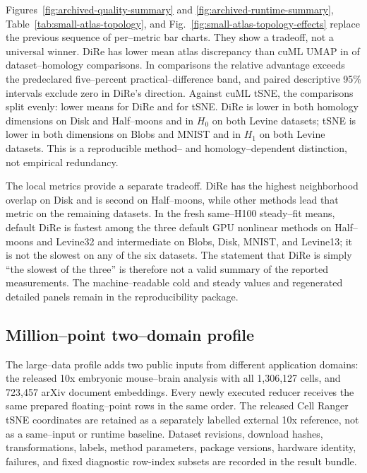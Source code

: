 \documentclass[11pt]{article}
\begin{document}
Figures~\ref{fig:archived-quality-summary} and
\ref{fig:archived-runtime-summary}, Table~\ref{tab:small-atlas-topology}, and
Fig.~\ref{fig:small-atlas-topology-effects} replace the previous sequence of
per--metric bar charts. They show a tradeoff, not a universal winner. DiRe has
lower mean atlas discrepancy than cuML UMAP in
\SmallAtlasDireLowerVsUmapCount{} of
\SmallAtlasUmapComparisonCount{} dataset--homology comparisons. In
\SmallAtlasDireFivePctLowerVsUmapCount{} comparisons the relative advantage
exceeds the predeclared five--percent practical--difference band, and
\SmallAtlasDireIntervalLowerVsUmapCount{} paired descriptive 95\% intervals
exclude zero in DiRe's direction. Against cuML tSNE, the
\SmallAtlasTsneComparisonCount{} comparisons split evenly:
\SmallAtlasDireLowerVsTsneCount{} lower means for DiRe and
\SmallAtlasTsneLowerVsDireCount{} for tSNE. DiRe is lower in both homology
dimensions on Disk and Half--moons and in $H_0$ on both Levine datasets;
tSNE is lower in both dimensions on Blobs and MNIST and in $H_1$ on both
Levine datasets. This is a reproducible method-- and
homology--dependent distinction, not empirical redundancy.

The local metrics provide a separate tradeoff. DiRe has the highest
neighborhood overlap on Disk and is second on Half--moons, while other methods
lead that metric on the remaining datasets. In the fresh same--H100
steady--fit means, default DiRe is fastest among the three default GPU
nonlinear methods on Half--moons and Levine32 and intermediate on Blobs,
Disk, MNIST, and Levine13; it is not the slowest on any of the six datasets.
The statement that DiRe is simply ``the slowest of the three'' is therefore
not a valid summary of the reported measurements. The machine--readable cold
and steady values and regenerated detailed panels remain in the
reproducibility package.

\subsection{Million--point two--domain profile}

The large--data profile adds two public inputs from different application
domains: the released 10x embryonic mouse--brain analysis with all
1,306,127 cells, and 723,457 arXiv document embeddings. Every newly executed
reducer receives the same prepared floating--point rows in the same order. The
released Cell Ranger tSNE coordinates are retained as a separately labelled
external 10x reference, not as a same--input or runtime baseline. Dataset
revisions, download hashes, transformations, labels, method parameters,
package versions, hardware identity, failures, and fixed diagnostic row-index
subsets are recorded in the result bundle.
\end{document}
